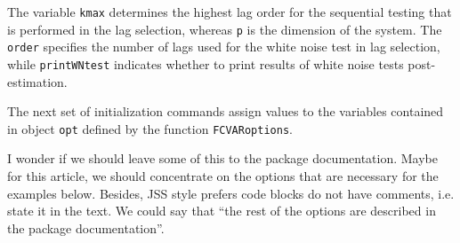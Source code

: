 \documentclass[article]{jss}
\begin{document}
The variable \verb|kmax| determines the highest lag order for the sequential testing that is performed in the lag selection, whereas \verb|p| is the dimension of the system. 
The \verb|order| specifies the number of lags used for the white noise test in lag selection, 
while \verb|printWNtest| indicates whether to print results of white noise tests post-estimation. 

The next set of initialization commands
assign values to the variables contained in object \verb|opt| defined by the function \verb|FCVARoptions|. 

\begin{leftbar} 
I wonder if we should leave some of this to the package documentation. 
Maybe for this article, we should concentrate on the options that are necessary for the examples below. 
Besides, JSS style prefers code blocks do not have comments, i.e. state it in the text. 
We could say that ``the rest of the options are described in the package documentation''. 
\end{leftbar}
\end{document}
